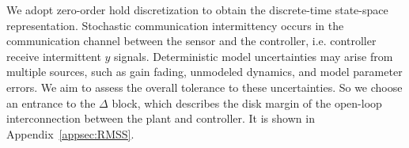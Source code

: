 
We adopt zero-order hold discretization to obtain the discrete-time state-space representation.
Stochastic communication intermittency occurs in the communication channel between the sensor and the controller, i.e. controller receive intermittent \(y\) signals.
Deterministic model uncertainties may arise from multiple sources, such as gain fading, unmodeled dynamics, and model parameter errors. We aim to assess the overall tolerance to these uncertainties. So we choose an entrance to the $\Delta$ block, which describes the disk margin of the open-loop interconnection between the plant and controller. It is shown in Appendix~\ref{appsec:RMSS}.

